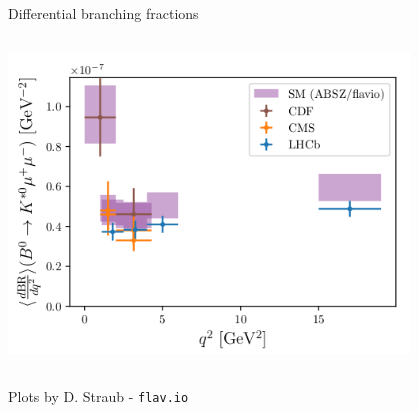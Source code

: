 \documentclass[9pt,usenames,dvipsnames]{beamer}
\begin{document}
\begin{frame}{Differential branching fractions}
\begin{columns}[c]
\begin{center}
			\includegraphics[width=0.8\textwidth]{./assets/tokstarmumu}
		\end{center}
	\end{columns}
	{\small Plots by D. Straub - \texttt{flav.io}}
\end{frame}
\end{document}
